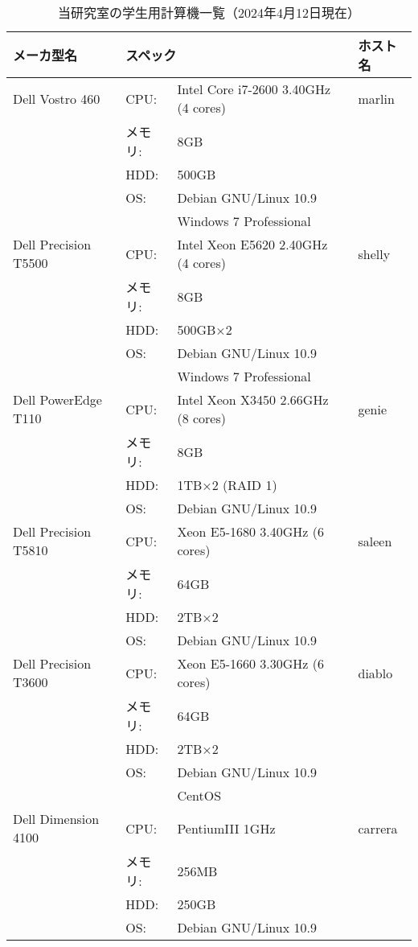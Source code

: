 \documentclass[main]{subfiles}
\begin{document}
\begin{table}[p]
    \caption{当研究室の学生用計算機一覧（2024年4月12日現在）}
    \label{tab:computers}
    \begin{center}
    \begin{tabular}{|l|l@{\hspace{0.5em}}l@{\hspace{1em}}l|l|}
    \hline
    メーカ型名 & \multicolumn{3}{l|}{スペック} & ホスト名 \\
    \hline
    Dell Vostro 460 
     & CPU:    & Intel Core i7-2600 3.40GHz (4 cores) & & marlin \\
     & メモリ: & 8GB & & \\
     & HDD:    & 500GB & & \\
     & OS:     & Debian GNU/Linux 10.9 & & \\
     &         & Windows 7 Professional & & \\
    \hline
    Dell Precision T5500 
     & CPU:    & Intel Xeon E5620 2.40GHz (4 cores) & & shelly \\
     & メモリ: & 8GB & & \\
     & HDD:    & 500GB×2 & & \\
     & OS:     & Debian GNU/Linux 10.9 & & \\
     &         & Windows 7 Professional & & \\
    \hline
    Dell PowerEdge T110 
     & CPU:    & Intel Xeon X3450 2.66GHz (8 cores) & & genie \\
     & メモリ: & 8GB & & \\
     & HDD:    & 1TB×2 (RAID 1) & & \\
     & OS:     & Debian GNU/Linux 10.9 & & \\
    \hline
    Dell Precision T5810 
     & CPU:    & Xeon E5-1680 3.40GHz (6 cores) & & saleen \\
     & メモリ: & 64GB & & \\
     & HDD:    & 2TB×2 & & \\
     & OS:     & Debian GNU/Linux 10.9 & & \\
    \hline
    Dell Precision T3600 
     & CPU:    & Xeon E5-1660 3.30GHz (6 cores) & & diablo \\
     & メモリ: & 64GB & & \\
     & HDD:    & 2TB×2 & & \\
     & OS:     & Debian GNU/Linux 10.9 & & \\
     &         & CentOS & & \\
    \hline
    Dell Dimension 4100 
     & CPU:    & PentiumIII 1GHz & & carrera \\
     & メモリ: & 256MB & & \\
     & HDD:    & 250GB & & \\
     & OS:     & Debian GNU/Linux 10.9 & & \\
    \hline
    \end{tabular}
    \end{center}
\end{table}
\end{document}
